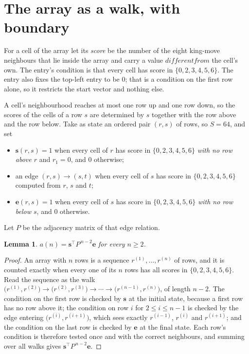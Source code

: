 \documentclass[11pt,a4paper]{article}
\theoremstyle{plain}
\newtheorem{lemma}[theorem]{Lemma}
\theoremstyle{definition}
\begin{document}
\section{The array as a walk, with boundary}

For a cell of the array let its \emph{score} be the number of the eight king-move neighbours that lie inside
the array and carry a value $different from$ the cell's own. The entry's condition is that every cell
has score in $\{0,2,3,4,5,6\}$. The entry also fixes the top-left entry to be $0$; that is a condition on the first row alone, so it restricts the start vector and nothing else.

A cell's neighbourhood reaches at most one row up and one row down, so the scores of the
cells of a row $s$ are determined by $s$ together with the row above and the row below.
Take as state an ordered pair $(r,s)$ of rows, so $S=64$, and set
\begin{itemize}
\item $\mathbf{s}(r,s)=1$ when every cell of $r$ has score in $\{0,2,3,4,5,6\}$ \emph{with no row
above $r$} and $r_1=0$, and $0$ otherwise;
\item an edge $(r,s)\to(s,t)$ when every cell of $s$ has score in $\{0,2,3,4,5,6\}$ computed from
$r$, $s$ and $t$;
\item $\mathbf{e}(r,s)=1$ when every cell of $s$ has score in $\{0,2,3,4,5,6\}$ \emph{with no row
below $s$}, and $0$ otherwise.
\end{itemize}
Let $P$ be the adjacency matrix of that edge relation.

\begin{lemma}\label{lem:walk}
$a(n)=\mathbf{s}^{\!\top}P^{\,n-2}\mathbf{e}$ for every $n\ge2$.
\end{lemma}

\begin{proof}
An array with $n$ rows is a sequence $r^{(1)},\dots,r^{(n)}$ of rows, and it is counted
exactly when every one of its $n$ rows has all scores in $\{0,2,3,4,5,6\}$. Read the sequence as the
walk $\bigl(r^{(1)},r^{(2)}\bigr)\to\bigl(r^{(2)},r^{(3)}\bigr)\to\cdots\to
\bigl(r^{(n-1)},r^{(n)}\bigr)$, of length $n-2$. The condition on the first row is
checked by $\mathbf{s}$ at the initial state, because a first row has no row above it; the
condition on row $i$ for $2\le i\le n-1$ is checked by the edge entering
$\bigl(r^{(i)},r^{(i+1)}\bigr)$, which sees exactly $r^{(i-1)}$, $r^{(i)}$ and
$r^{(i+1)}$; and the condition on the last row is checked by $\mathbf{e}$ at the final
state. Each row's condition is therefore tested once and with the correct neighbours, and
summing over all walks gives $\mathbf{s}^{\!\top}P^{\,n-2}\mathbf{e}$.
\end{proof}
\end{document}
